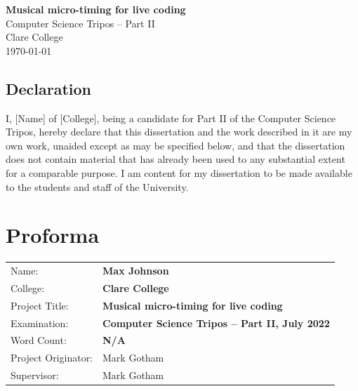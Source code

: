 \documentclass[12pt,twoside,openright]{report}
\begin{document}

\begin{titlepage}
    \pagestyle{empty}


    \vspace*{60mm}
    \begin{center}
    \Huge
    \textbf{Musical micro-timing for live coding} \\[5mm]
    Computer Science Tripos -- Part II \\[5mm]
    Clare College \\[5mm]
    \today
    \end{center}
\end{titlepage}


\pagestyle{plain}

\section*{Declaration}

I, [Name] of [College], being a candidate for Part II of the Computer Science Tripos, hereby declare that this dissertation and the work described in it are my own work, unaided except as may be specified below, and that the dissertation does not contain material that has already been used to any substantial extent for a comparable purpose. I am content for my dissertation to be made available to the students and staff of the University.

\bigskip
{}

\medskip
{}


\newpage
\chapter*{Proforma}

{\large
\begin{tabular}{ll}
Name:               & \bf Max Johnson                       \\
College:            & \bf Clare College                     \\
Project Title:      & \bf Musical micro-timing for live coding \\
Examination:        & \bf Computer Science Tripos -- Part II, July 2022  \\
Word Count:         & \bf N/A \\
Project Originator: & Mark Gotham                    \\
Supervisor:         & Mark Gotham                    \\ 
\end{tabular}
}
\end{document}

